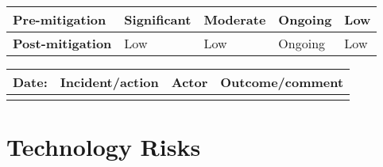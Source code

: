\begin{table}
\begin{tabularx}{\textwidth}{| l | l | X | X | X |}
		\textbf{Pre-mitigation} & Significant & Moderate & Ongoing & Low \\ \hline
		\textbf{Post-mitigation} & Low & Low & Ongoing & Low \\ \hline \hline
	\end{tabularx}
	\begin{tabularx}{\textwidth}{| l | X | l | X |}
		\hline
		\textbf{Date:} & \textbf{Incident/action} & \textbf{Actor} & \textbf{Outcome/comment} \\ \hline
		 &  &  &  \\ \hline
	\end{tabularx}%
\end{table}

\FloatBarrier

\section{Technology Risks}
\label{Technology_Risks}

\FloatBarrier

